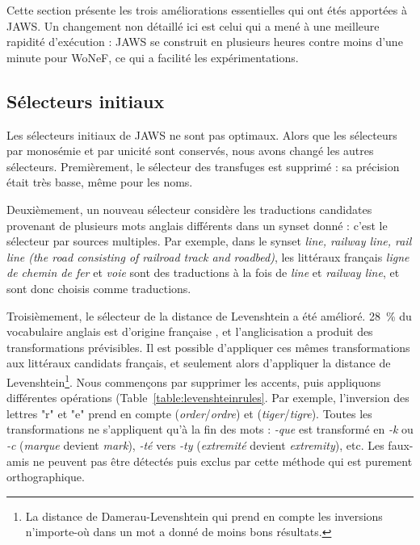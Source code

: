 Cette section présente les trois améliorations essentielles qui ont étés
apportées à JAWS. Un changement non détaillé ici est celui qui a mené à une
meilleure rapidité d'exécution : JAWS se construit en plusieurs heures contre
moins d'une minute pour WoNeF, ce qui a facilité les expérimentations.

\subsection{Sélecteurs initiaux}
\label{subsec:revisiting_extraction_heuristics}


Les sélecteurs initiaux de JAWS ne sont pas optimaux. Alors que les sélecteurs
par monosémie et par unicité sont conservés, nous avons changé les autres
sélecteurs. Premièrement, le sélecteur des transfuges est supprimé : sa
précision était très basse, même pour les noms.

Deuxièmement, un nouveau sélecteur considère les traductions candidates
provenant de plusieurs mots anglais différents dans un synset donné : c'est le
sélecteur par sources multiples. Par exemple, dans le synset \textit{line,
railway line, rail line (the road consisting of railroad track and roadbed)},
les littéraux français \textit{ligne de chemin de fer} et \textit{voie} sont
des traductions à la fois de \textit{line} et \textit{railway line}, et sont
donc choisis comme traductions.

Troisièmement, le sélecteur de la distance de Levenshtein a été amélioré. 28~\%
du vocabulaire anglais est d'origine française \citep{finkenstaedt1973ordered},
et l'anglicisation a produit des transformations prévisibles. Il est possible
d'appliquer ces mêmes transformations aux littéraux candidats français, et
seulement alors d'appliquer la distance de Levenshtein\footnote{La distance de
    Damerau-Levenshtein qui prend en compte les inversions n'importe-où dans un
mot \citep{damerau1964technique} a donné de moins bons résultats.}. Nous
commençons par supprimer les accents, puis appliquons différentes opérations
(Table~\ref{table:levenshteinrules}. Par exemple, l'inversion des lettres "r"
et "e" prend en compte (\textit{order}/\textit{ordre}) et
(\textit{tiger}/\textit{tigre}).  Toutes les transformations ne s'appliquent
qu'à la fin des mots : \textit{-que} est transformé en \textit{-k} ou
\textit{-c} (\textit{marque} devient \textit{mark}), \textit{-té} vers
\textit{-ty} (\textit{extremité} devient \textit{extremity}), etc. Les
faux-amis ne peuvent pas être détectés puis exclus par cette méthode qui est
purement orthographique.

